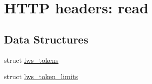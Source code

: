 \hypertarget{group__HTTP-headers-read}{}\section{H\+T\+TP headers\+: read}
\label{group__HTTP-headers-read}
\subsection*{Data Structures}
\begin{DoxyCompactItemize}
\item 
struct \hyperlink{structlws__tokens}{lws\+\_\+tokens}
\item 
struct \hyperlink{structlws__token__limits}{lws\+\_\+token\+\_\+limits}
\end{DoxyCompactItemize}
